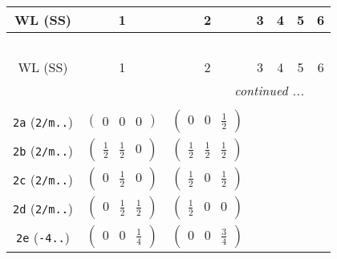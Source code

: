 \documentclass[fleqn,9pt,landscape]{jsarticle}
\begin{document}
\begin{center}
\renewcommand{\arraystretch}{1.2}
\begin{longtable}{ccccccc}
 \hline \hline
WL (SS) & 1 & 2 & 3 & 4 & 5 & 6 \\ \hline \endfirsthead

\multicolumn{6}{l}{\tablename\ \thetable{}} \\
 \hline \hline
WL (SS) & 1 & 2 & 3 & 4 & 5 & 6 \\ \hline \endhead

 \hline \hline
\multicolumn{6}{r}{\footnotesize\it continued ...} \\ \endfoot

 \hline \hline
\multicolumn{6}{r}{} \\ \endlastfoot

{\tt 2a} ({\tt 2/m..}) & $ \begin{pmatrix} 0 & 0 & 0 \end{pmatrix} $ & $ \begin{pmatrix} 0 & 0 & \frac{1}{2} \end{pmatrix} $ & $  $ & $  $ & $  $ & $  $ \\ \hline
{\tt 2b} ({\tt 2/m..}) & $ \begin{pmatrix} \frac{1}{2} & \frac{1}{2} & 0 \end{pmatrix} $ & $ \begin{pmatrix} \frac{1}{2} & \frac{1}{2} & \frac{1}{2} \end{pmatrix} $ & $  $ & $  $ & $  $ & $  $ \\ \hline
{\tt 2c} ({\tt 2/m..}) & $ \begin{pmatrix} 0 & \frac{1}{2} & 0 \end{pmatrix} $ & $ \begin{pmatrix} \frac{1}{2} & 0 & \frac{1}{2} \end{pmatrix} $ & $  $ & $  $ & $  $ & $  $ \\ \hline
{\tt 2d} ({\tt 2/m..}) & $ \begin{pmatrix} 0 & \frac{1}{2} & \frac{1}{2} \end{pmatrix} $ & $ \begin{pmatrix} \frac{1}{2} & 0 & 0 \end{pmatrix} $ & $  $ & $  $ & $  $ & $  $ \\ \hline
{\tt 2e} ({\tt -4..}) & $ \begin{pmatrix} 0 & 0 & \frac{1}{4} \end{pmatrix} $ & $ \begin{pmatrix} 0 & 0 & \frac{3}{4} \end{pmatrix} $ & $  $ & $  $ & $  $ & $  $ \\ \hline

\end{longtable}
\end{center}
\end{document}

